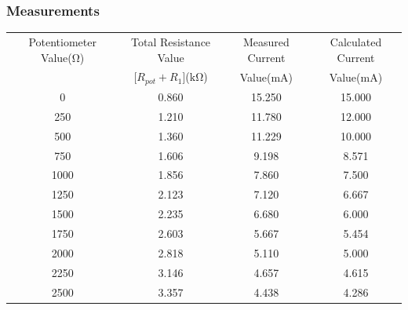 \documentclass[a4paper]{article}
\begin{document}
\subsubsection{Measurements}
\begin{center}
    \begin{tabular}{|c|c|c|c|}
        \hline
        Potentiometer Value($\si{\ohm}$) & Total Resistance Value
        & Measured Current & Calculated Current
        \\
         & [$R_{pot}+R_1$]($\si{\kilo\ohm}$) & Value($\si{\milli\ampere}$) & Value($\si{\milli\ampere}$)\\\hline
        0&0.860&15.250&15.000\\\hline
        250&1.210&11.780&12.000\\\hline
        500&1.360&11.229&10.000\\\hline
        750&1.606&9.198&8.571\\\hline
        1000&1.856&7.860&7.500\\\hline
        1250&2.123&7.120&6.667\\\hline
        1500&2.235&6.680&6.000\\\hline
        1750&2.603&5.667&5.454\\\hline
        2000&2.818&5.110&5.000\\\hline
        2250&3.146&4.657&4.615\\\hline
        2500&3.357&4.438&4.286\\\hline
    \end{tabular}
    
\end{center}
\end{document}
